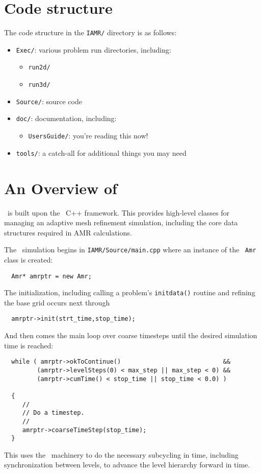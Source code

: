 \section{Code structure}

The code structure in the {\tt IAMR/} directory is as follows:
\begin{itemize}
\item {\tt Exec/}: various problem run directories, including:
  \begin{itemize}
  \item {\tt run2d/}
  \item {\tt run3d/}
  \end{itemize}

\item {\tt Source/}: source code

\item {\tt doc/}: documentation, including:
\begin{itemize}
 \item {\tt UsersGuide/}: you're reading this now!
\end{itemize}

\item {\tt tools/}: a catch-all for additional things you may need 
\end{itemize}


\section{An Overview of \iamr}

\iamr\ is built upon the \amrex\ C++ framework.  This provides
high-level classes for managing an adaptive mesh refinement simulation,
including the core data structures required in AMR calculations.

The \iamr\ simulation begins in {\tt IAMR/Source/main.cpp} where an instance
of the \amrex\ {\tt Amr} class is created:
\begin{lstlisting}
  Amr* amrptr = new Amr;
\end{lstlisting}
The initialization, including calling a problem's {\tt initdata()}
routine and refining the base grid occurs next through
\begin{lstlisting}
  amrptr->init(strt_time,stop_time);
\end{lstlisting}
And then comes the main loop over coarse timesteps until the
desired simulation time is reached:
\begin{lstlisting}
  while ( amrptr->okToContinue()                            &&
         (amrptr->levelSteps(0) < max_step || max_step < 0) &&
         (amrptr->cumTime() < stop_time || stop_time < 0.0) )

  {
     //
     // Do a timestep.
     //
     amrptr->coarseTimeStep(stop_time);
  }
\end{lstlisting}
This uses the \amrex\ machinery to do the necessary subcycling in time,
including synchronization between levels, to advance the level hierarchy
forward in time.  

